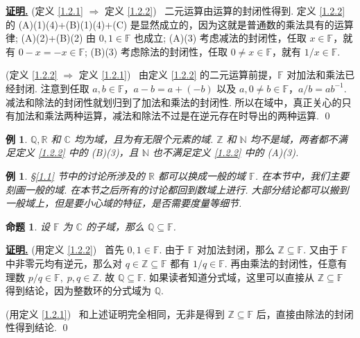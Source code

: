 \documentclass[10pt,openany]{article}
\theoremstyle{thmstyle} %
\theoremstyle{defstyle} %
\theoremstyle{prostyle} %
\newtheorem{proposition}[theorem]{命题}
\theoremstyle{exastyle}
\newtheorem{example}[theorem]{例}
\theoremstyle{remstyle}
\renewenvironment{proof}[1][证明]{\par\underline{\textbf{#1.}} \;\fangsong}{\qed\par}
\newcommand{\F}{\mathbb{F}}
\begin{document}
\begin{proof}
	(定义 \ref{1.2.1}  \( \Rightarrow \) 定义 \ref{1.2.2}) \ 二元运算由运算的封闭性得到. 定义 \ref{1.2.2} 的 (A)(1)(4)+(B)(1)(4)+(C) 是显然成立的，因为这就是普通数的乘法具有的运算律; (A)(2)+(B)(2) 由 \( 0,1 \in \F \) 也成立; (A)(3) 考虑减法的封闭性，任取 \( x \in \F \)，就有 \( 0-x=-x \in \F \); (B)(3) 考虑除法的封闭性，任取 \( 0 \neq x \in \F \)，就有 \( 1/x \in \F \).
	
	\vspace{1ex}
	
	(定义 \ref{1.2.2}  \( \Rightarrow \) 定义 \ref{1.2.1}) \ 由定义 \ref{1.2.2} 的二元运算前提，\( \F \) 对加法和乘法已经封闭. 注意到任取 \( a,b \in \F \)，\( a-b=a+(-b) \) 以及 \( a, 0 \neq b \in \F \)，\( a/b=ab^{-1} \). 减法和除法的封闭性就划归到了加法和乘法的封闭性. 所以在域中，真正关心的只有加法和乘法两种运算，减法和除法不过是在逆元存在时导出的两种运算.
\end{proof}

\begin{example}
	\( \mathbb{Q}, \mathbb{R} \) 和 \( \mathbb{C} \) 均为域，且为有无限个元素的域. \( \mathbb{Z} \) 和 \( \mathbb{N} \) 均不是域，两者都不满足定义 \ref{1.2.2} 中的 (B)(3)，且 \( \mathbb{N} \) 也不满足定义 \ref{1.2.2} 中的 (A)(3).
\end{example}

\begin{example}
	\S \ref{1.1} 节中的讨论所涉及的 \( \mathbb{R} \) 都可以换成一般的域 \( \F \). 在本节中，我们主要刻画一般的域. 在本节之后所有的讨论都回到数域上进行. 大部分结论都可以搬到一般域上，但是要小心域的特征，是否需要度量等细节.
\end{example}

\begin{proposition}\label{1.2.6}
	设 \( \F \) 为 \( \mathbb{C} \) 的子域，那么 \( \mathbb{Q} \subseteq \F \).
	
\end{proposition}

\begin{proof}
	(用定义 \ref{1.2.2}) \ 首先 \( 0,1 \in \F \). 由于 \( \F \) 对加法封闭，那么 \( \mathbb{Z} \subseteq \F \). 又由于 \( \F \) 中非零元均有逆元，那么对 \( q \in \mathbb{Z} \subseteq \F \) 都有 \( 1/q \in \F \). 再由乘法的封闭性，任意有理数 \( p/q \in \F, \; p,q \in \mathbb{Z} \). 故 \( \mathbb{Q} \subseteq \F \). 如果读者知道分式域，这里可以直接从 \( \mathbb{Z} \subseteq \F \) 得到结论，因为整数环的分式域为 \( \mathbb{Q} \).
	
	\vspace{1ex}
	
	(用定义 \ref{1.2.1}) \ 和上述证明完全相同，无非是得到 \( \mathbb{Z} \subseteq \F \) 后，直接由除法的封闭性得到结论.
\end{proof}
\end{document}
